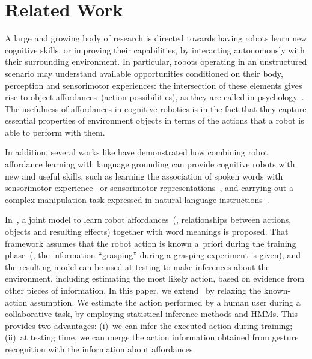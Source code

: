 
\section{Related Work}

A large and growing body of research is directed towards having robots learn new cognitive skills, or improving their capabilities, by interacting autonomously with their surrounding environment. In particular, robots operating in an unstructured scenario may understand available opportunities conditioned on their body, perception and sensorimotor experiences: the intersection of these elements gives rise to object affordances~(action possibilities), as they are called in psychology~\cite{jamone:2016:tcds}. The usefulness of affordances in cognitive robotics is in the fact that they capture essential properties of environment objects in terms of the actions that a robot is able to perform with them.

In addition, several works like have demonstrated how combining robot affordance learning with language grounding can provide cognitive robots with new and useful skills, such as learning the association of spoken words with sensorimotor experience~\cite{salvi:2012:smcb} or sensorimotor representations~\cite{stramandinoli:2016:icdl}, and carrying out a complex manipulation task expressed in natural language instructions~\cite{antunes:2016:icra}.

In~\cite{salvi:2012:smcb}, a joint model to learn robot affordances~(\ie, relationships between actions, objects and resulting effects) together with word meanings is proposed. That framework assumes that the robot action is known a~priori during the training phase~(\eg, the information ``grasping'' during a grasping experiment is given), and the resulting model can be used at testing to make inferences about the environment, including estimating the most likely action, based on evidence from other pieces of information. In this paper, we extend~\cite{salvi:2012:smcb} by relaxing the known-action assumption. We estimate the action performed by a human user during a \hr{} collaborative task, by employing statistical inference methods and \acp{HMM}. This provides two advantages: (i)~we can infer the executed action during training; (ii)~at testing time, we can merge the action information obtained from gesture recognition with the information about affordances.

